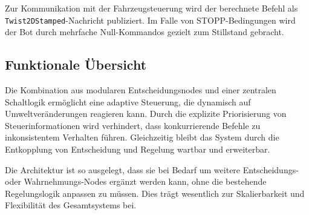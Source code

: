 Zur Kommunikation mit der Fahrzeugsteuerung wird der berechnete Befehl als \texttt{Twist2DStamped}-Nachricht publiziert. Im Falle von STOPP-Bedingungen wird der Bot durch mehrfache Null-Kommandos gezielt zum Stillstand gebracht.

\subsection{Funktionale Übersicht}
Die Kombination aus modularen Entscheidungsnodes und einer zentralen Schaltlogik ermöglicht eine adaptive Steuerung, die dynamisch auf Umweltveränderungen reagieren kann. Durch die explizite Priorisierung von Steuerinformationen wird verhindert, dass konkurrierende Befehle zu inkonsistentem Verhalten führen. Gleichzeitig bleibt das System durch die Entkopplung von Entscheidung und Regelung wartbar und erweiterbar.

Die Architektur ist so ausgelegt, dass sie bei Bedarf um weitere Entscheidungs- oder Wahrnehmungs-Nodes ergänzt werden kann, ohne die bestehende Regelungslogik anpassen zu müssen. Dies trägt wesentlich zur Skalierbarkeit und Flexibilität des Gesamtsystems bei.


